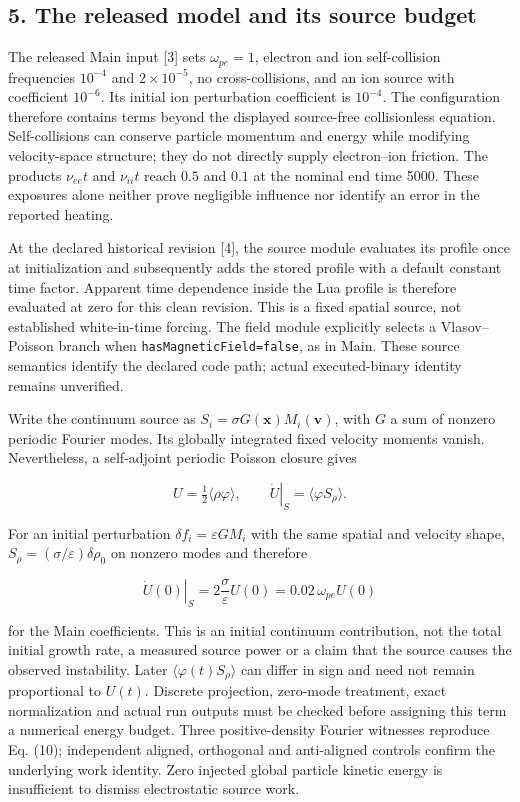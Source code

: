 \subsection{5. The released model and its source
budget}\label{the-released-model-and-its-source-budget}

The released Main input {[}3{]} sets \(\omega_{pe}=1\), electron and ion
self-collision frequencies \(10^{-4}\) and \(2\times10^{-5}\), no
cross-collisions, and an ion source with coefficient \(10^{-6}\). Its
initial ion perturbation coefficient is \(10^{-4}\). The configuration
therefore contains terms beyond the displayed source-free collisionless
equation. Self-collisions can conserve particle momentum and energy
while modifying velocity-space structure; they do not directly supply
electron--ion friction. The products \(\nu_{ee}t\) and \(\nu_{ii}t\)
reach \(0.5\) and \(0.1\) at the nominal end time 5000. These exposures
alone neither prove negligible influence nor identify an error in the
reported heating.

At the declared historical revision {[}4{]}, the source module evaluates
its profile once at initialization and subsequently adds the stored
profile with a default constant time factor. Apparent time dependence
inside the Lua profile is therefore evaluated at zero for this clean
revision. This is a fixed spatial source, not established white-in-time
forcing. The field module explicitly selects a Vlasov--Poisson branch
when \nolinkurl{hasMagneticField=false}, as in Main. These source semantics
identify the declared code path; actual executed-binary identity remains
unverified.

Write the continuum source as
\(S_i=\sigma G(\boldsymbol x)M_i(\boldsymbol v)\), with \(G\) a sum of
nonzero periodic Fourier modes. Its globally integrated fixed velocity
moments vanish. Nevertheless, a self-adjoint periodic Poisson closure
gives

\[
U=\tfrac12\langle\rho\varphi\rangle,
\qquad \left.\dot U\right|_S=\langle\varphi S_\rho\rangle.
\tag{9}
\]

For an initial perturbation \(\delta f_i=\varepsilon GM_i\) with the
same spatial and velocity shape,
\(S_\rho=(\sigma/\varepsilon)\delta\rho_0\) on nonzero modes and
therefore

\[
\left.\dot U(0)\right|_S=2\frac{\sigma}{\varepsilon}U(0)
=0.02\,\omega_{pe}U(0)
\tag{10}
\]

for the Main coefficients. This is an initial continuum contribution,
not the total initial growth rate, a measured source power or a claim
that the source causes the observed instability. Later
\(\langle\varphi(t)S_\rho\rangle\) can differ in sign and need not
remain proportional to \(U(t)\). Discrete projection, zero-mode
treatment, exact normalization and actual run outputs must be checked
before assigning this term a numerical energy budget. Three
positive-density Fourier witnesses reproduce Eq. (10); independent
aligned, orthogonal and anti-aligned controls confirm the underlying
work identity. Zero injected global particle kinetic energy is
insufficient to dismiss electrostatic source work.

